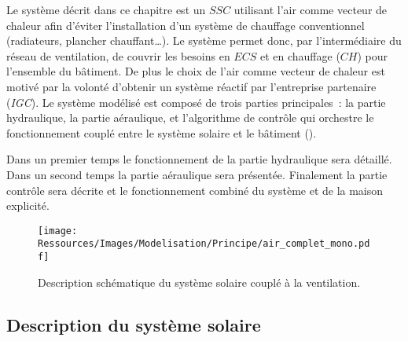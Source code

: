 Le système décrit dans ce chapitre est un $SSC$ utilisant l’air comme vecteur de chaleur
afin d’éviter l’installation d’un système de chauffage conventionnel (radiateurs, plancher
chauffant\dots). Le système permet donc, par l’intermédiaire du réseau de ventilation, de
couvrir les besoins en $ECS$ et en chauffage ($CH$) pour l’ensemble du bâtiment. De plus
le choix de l’air comme vecteur de chaleur est motivé par la volonté d’obtenir un système
réactif par l’entreprise partenaire (\textit{IGC}). Le système modélisé est composé de trois
parties principales~: la partie hydraulique, la partie aéraulique, et l’algorithme de
contrôle qui orchestre le fonctionnement couplé entre le système solaire et le bâtiment
().

Dans un premier temps le fonctionnement de la partie hydraulique sera détaillé. Dans un
second temps la partie aéraulique sera présentée. Finalement la partie contrôle sera
décrite et le fonctionnement combiné du système et de la maison explicité.

\begin{figure}
    \centering
    \texttt{[image: Ressources/Images/Modelisation/Principe/air\_complet\_mono.pdf]}
    \caption{Description schématique du système solaire couplé à la ventilation.
             \label{fig:air_complet_mono}}
\end{figure}




\subsection{Description du système solaire} %
\label{sub:description_du_systeme_solaire}
